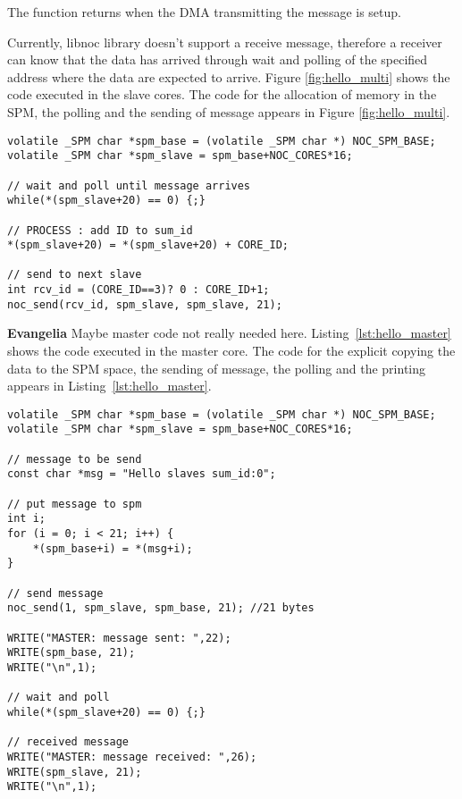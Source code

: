 \documentclass[a4paper,fontsize=10pt,twoside,DIV15,BCOR12mm,headinclude=true,footinclude=false,pagesize,bibtotoc]{scrbook}
\newcommand{\comment}[3]{

\textsf{\textbf{#1}} {\color{#3}#2}}
\newcommand{\eva}[1]{\comment{Evangelia}{#1}{Green}}
\begin{document}
The function returns when the DMA transmitting the message is setup.

Currently, libnoc library doesn't support a receive message,
therefore a receiver can know that the data has arrived through wait
and polling of the specified address where the data are expected to arrive.
Figure \ref{fig:hello_multi} shows the code executed in the slave cores.
The code for the allocation of memory in the SPM, the polling and the sending of message appears in Figure \ref{fig:hello_multi}.

\begin{lstlisting}[float,caption={A 2x2 Hello World application: Slave.\label{lst:hello_multi}}]
volatile _SPM char *spm_base = (volatile _SPM char *) NOC_SPM_BASE;
volatile _SPM char *spm_slave = spm_base+NOC_CORES*16;

// wait and poll until message arrives
while(*(spm_slave+20) == 0) {;}

// PROCESS : add ID to sum_id
*(spm_slave+20) = *(spm_slave+20) + CORE_ID;

// send to next slave
int rcv_id = (CORE_ID==3)? 0 : CORE_ID+1;
noc_send(rcv_id, spm_slave, spm_slave, 21);
\end{lstlisting}

\eva{Maybe master code not really needed here.}
Listing~\ref{lst:hello_master} shows the code executed in the master core. The code for the explicit copying the data to the SPM space, the sending of message, the polling and the printing appears in Listing~\ref{lst:hello_master}.

\begin{lstlisting}[float,caption={A 2x2 Hello World application: Master.\label{lst:hello_master}}]
volatile _SPM char *spm_base = (volatile _SPM char *) NOC_SPM_BASE;
volatile _SPM char *spm_slave = spm_base+NOC_CORES*16;

// message to be send
const char *msg = "Hello slaves sum_id:0";

// put message to spm
int i;
for (i = 0; i < 21; i++) {
	*(spm_base+i) = *(msg+i);
}

// send message
noc_send(1, spm_slave, spm_base, 21); //21 bytes

WRITE("MASTER: message sent: ",22);
WRITE(spm_base, 21);
WRITE("\n",1);

// wait and poll
while(*(spm_slave+20) == 0) {;}

// received message
WRITE("MASTER: message received: ",26);
WRITE(spm_slave, 21);
WRITE("\n",1);
\end{lstlisting}
\end{document}
